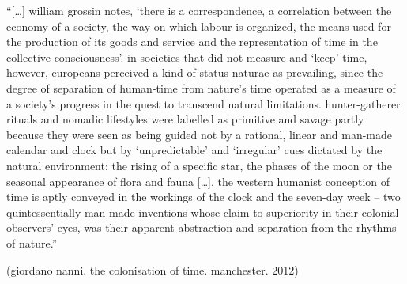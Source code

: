 \documentclass[12pt,a4paper,british,landscape]{article}
\begin{document}
\begin{center}


\vspace{0.2cm}

``[\dots] william grossin notes, `there is a correspondence, a correlation between the economy of a society, the way on which labour is organized, the means used for the production of its goods and service and the representation of time in the collective consciousness'.
in societies that did not measure and ‘keep’ time, however, europeans perceived a kind of status naturae as prevailing, since the degree of separation of human-time from nature’s time operated as a measure of a society’s progress in the quest to transcend natural limitations.
    hunter-gatherer rituals and nomadic lifestyles were labelled as primitive and savage partly because they were seen as being guided not by a rational, linear and man-made calendar and clock but by ‘unpredictable’ and ‘irregular’ cues dictated by the natural environment: the rising of a specific star, the phases of the moon or the seasonal appearance of flora and fauna [\dots].
the western humanist conception of time is aptly conveyed in the workings of the clock and the seven-day week -- two quintessentially man-made inventions whose claim to superiority in their colonial observers' eyes, was their apparent abstraction and separation from the rhythms of nature.''

\vspace{0.5cm}

(giordano nanni. the colonisation of time. manchester. 2012)


\end{center}
\end{document}

